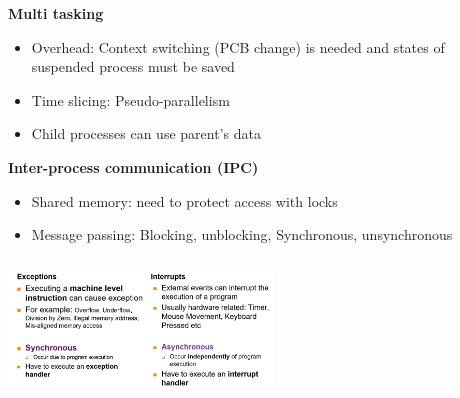 \documentclass[10pt, landscape]{article}
\begin{document}
\begin{multicols}{4}
\textbf{Multi tasking}
\begin{itemize}
    \item Overhead: Context switching (PCB change) is needed and states of suspended process must be saved 
    \item Time slicing: Pseudo-parallelism
    \item Child processes can use parent's data
\end{itemize}

\textbf{Inter-process communication (IPC)}
\begin{itemize}
    \item Shared memory: need to protect access with locks 
    \item Message passing: Blocking, unblocking, Synchronous, unsynchronous
\end{itemize}

\includegraphics*[width=7cm, height=3.8cm]{except_interrupt}


\end{multicols}
\end{document}
